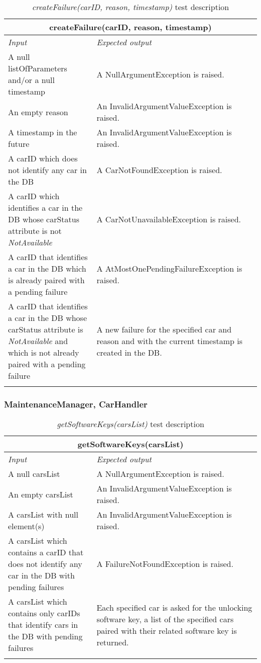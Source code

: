 \begin{longtable}{p{0.35\linewidth}p{0.65\linewidth}}
\multicolumn{2}{c}{\textbf{createFailure(carID, reason, timestamp)}} \\
\toprule
\emph{Input} & \emph{Expected output} \\
\midrule
A null listOfParameters and/or a null timestamp & A NullArgumentException is raised.\\
\midrule
An empty reason & An InvalidArgumentValueException is raised. \\
\midrule
A timestamp in the future & An InvalidArgumentValueException is raised. \\
\midrule
A carID which does not identify any car in the DB & A CarNotFoundException is raised.\\
\midrule
A carID which identifies a car in the DB whose carStatus attribute is not \emph{NotAvailable} & A CarNotUnavailableException is raised.\\
\midrule
A carID that identifies a car in the DB which is already paired with a pending failure & A AtMostOnePendingFailureException is raised.\\
\midrule
A carID that identifies a car in the DB whose carStatus attribute is \emph{NotAvailable} and which is not already paired with a pending failure & A new failure for the specified car and reason and with the current timestamp is created in the DB.\\
\bottomrule
\caption{\emph{createFailure(carID, reason, timestamp)} test description}
\end{longtable}

\subsubsection{MaintenanceManager, CarHandler}
\begin{longtable}{p{0.35\linewidth}p{0.65\linewidth}}
\multicolumn{2}{c}{\textbf{getSoftwareKeys(carsList)}} \\
\toprule
\emph{Input} & \emph{Expected output} \\
\midrule
A null carsList & A NullArgumentException is raised.\\
\midrule
An empty carsList & An InvalidArgumentValueException is raised. \\
\midrule
A carsList with null element(s) & An InvalidArgumentValueException is raised.\\
\midrule
A carsList which contains a carID that does not identify any car in the DB with pending failures & A FailureNotFoundException is raised. \\
\midrule
A carsList which contains only carIDs that identify cars in the DB with pending failures & Each specified car is asked for the unlocking software key, a list of the specified cars paired with their related software key is returned.\\
\bottomrule
\caption{\emph{getSoftwareKeys(carsList)} test description}
\end{longtable}

